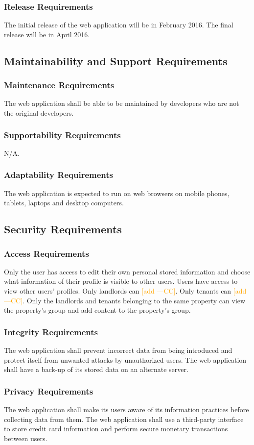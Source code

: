 \documentclass[12pt, titlepage]{article}
\newcommand{\authornote}[3]{\textcolor{#1}{[#3 ---#2]}}
\newcommand{\authornote}[3]{}
\newcommand{\cc}[1]{\authornote{orange}{CC}{#1}}
\begin{document}
{\subsubsection{Release Requirements}
The initial release of the web application will be in February 2016. The final release will be in April 2016.
\subsection{Maintainability and Support Requirements}
\subsubsection{Maintenance Requirements}
The web application shall be able to be maintained by developers who are not the original developers.
\subsubsection{Supportability Requirements}
N/A.
\subsubsection{Adaptability Requirements}
The web application is expected to run on web browsers on mobile phones, tablets, laptops and desktop computers.
\subsection{Security Requirements}
\subsubsection{Access Requirements}
Only the user has access to edit their own personal stored information and choose what information of their profile is visible to other users. Users have access to view other users' profiles. Only landlords can \cc{add}. Only tenants can \cc{add}. Only the landlords and tenants belonging to the same property can view the property's group and add content to the property's group.
\subsubsection{Integrity Requirements}
The web application shall prevent incorrect data from being introduced and protect itself from unwanted attacks by unauthorized users. The web application shall have a back-up of its stored data on an alternate server.
\subsubsection{Privacy Requirements}
The web application shall make its users aware of its information practices before collecting data from them. The web application shall use a third-party interface to store credit card information and perform secure monetary transactions between users.
}
\end{document}
